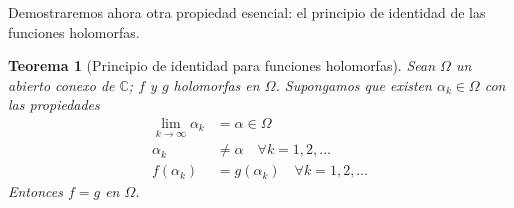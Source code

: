 \documentclass[10pt]{article}
\theoremstyle{plain}
\newtheorem{theorem}{Teorema}[section]
\theoremstyle{definition}
\theoremstyle{remark}
\begin{document}
Demostraremos ahora otra propiedad esencial: el principio de identidad de las funciones holomorfas.

\begin{theorem}[Principio de identidad para funciones holomorfas]
Sean $\Omega$ un abierto conexo de $\mathbb{C}$; $f$ y $g$ holomorfas en $\Omega$. Supongamos que existen $\alpha_{k} \in \Omega$ con las propiedades
$$\begin{aligned}
\lim_{k \rightarrow \infty} \alpha_{k} &= \alpha \in \Omega \\
\alpha_{k} &\neq \alpha \quad \forall k=1,2, \ldots \\
f(\alpha_{k}) &= g(\alpha_{k}) \quad \forall k=1,2, \ldots
\end{aligned}$$
Entonces $f=g$ en $\Omega$.
\end{theorem}
\end{document}
